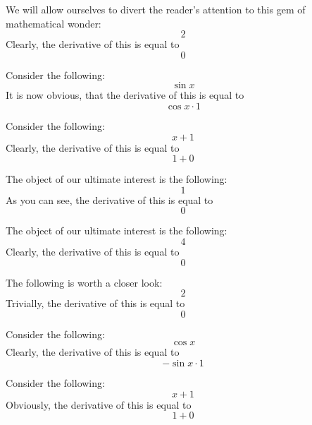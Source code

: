 \documentclass{article}
\begin{document}
We will allow ourselves to divert the reader's attention to this gem of mathematical wonder:
\begin{equation}
2 
\end{equation}
Clearly, the derivative of this is equal to
\begin{equation}
0 
\end{equation}

Consider the following:
\begin{equation}
\sin x 
\end{equation}
It is now obvious, that the derivative of this is equal to
\begin{equation}
\cos x \cdot 1 
\end{equation}

Consider the following:
\begin{equation}
x + 1 
\end{equation}
Clearly, the derivative of this is equal to
\begin{equation}
1 + 0 
\end{equation}

The object of our ultimate interest is the following:
\begin{equation}
1 
\end{equation}
As you can see, the derivative of this is equal to
\begin{equation}
0 
\end{equation}

The object of our ultimate interest is the following:
\begin{equation}
4 
\end{equation}
Clearly, the derivative of this is equal to
\begin{equation}
0 
\end{equation}

The following is worth a closer look:
\begin{equation}
2 
\end{equation}
Trivially, the derivative of this is equal to
\begin{equation}
0 
\end{equation}

Consider the following:
\begin{equation}
\cos x 
\end{equation}
Clearly, the derivative of this is equal to
\begin{equation}
-\sin x \cdot 1 
\end{equation}

Consider the following:
\begin{equation}
x + 1 
\end{equation}
Obviously, the derivative of this is equal to
\begin{equation}
1 + 0 
\end{equation}
\end{document}
